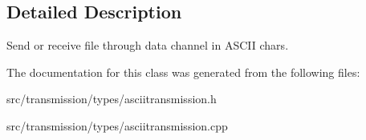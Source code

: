 \subsection{Detailed Description}
Send or receive file through data channel in A\+S\+C\+II chars. 

The documentation for this class was generated from the following files\+:\begin{DoxyCompactItemize}
\item 
src/transmission/types/asciitransmission.\+h\item 
src/transmission/types/asciitransmission.\+cpp\end{DoxyCompactItemize}
